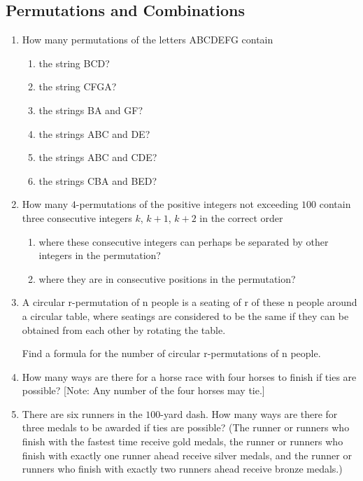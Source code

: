 \documentclass{../../cls/sig-alternate-05-2015}
\begin{document}
\subsection{Permutations and Combinations}
\begin{enumerate}

    \item How many permutations of the letters ABCDEFG contain
    \begin{enumerate}
        \item the string BCD?
        \item the string CFGA?
        \item the strings BA and GF?
        \item the strings ABC and DE?
        \item the strings ABC and CDE?
        \item the strings CBA and BED?
    \end{enumerate}
    
    \item How many $4$-permutations of the positive integers not exceeding
    $100$ contain three consecutive integers $k$, $k + 1$,
    $k + 2$ in the correct order
    \begin{enumerate}
        \item where these consecutive integers can perhaps be separated
        by other integers in the permutation?
        \item  where they are in consecutive positions in the permutation?
    \end{enumerate}
    
    \item A circular r-permutation of n people is a seating of r of
    these n people around a circular table, where seatings are considered
    to be the same if they can be obtained from each other
    by rotating the table.
    
    Find a formula for the number of circular r-permutations
    of n people.
    
    \item How many ways are there for a horse race with four horses
    to finish if ties are possible? [Note: Any number of the
    four horses may tie.]
    
    \item There are six runners in the $100$-yard dash. How many
    ways are there for three medals to be awarded if ties
    are possible? (The runner or runners who finish with the
    fastest time receive gold medals, the runner or runners
    who finish with exactly one runner ahead receive silver
     medals, and the runner or runners who finish with exactly
    two runners ahead receive bronze medals.)

\end{enumerate}
\end{document}
